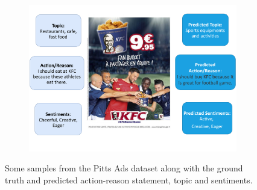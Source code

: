\documentclass[hidelinks,11pt,a4paper]{report}
\begin{document}
\begin{figure}[!h]
\begin{subfigure}[b]{0.49\textwidth}
         \caption{}
         \label{fig:preds-sup-2}
     \end{subfigure}
     \begin{subfigure}[b]{0.49\textwidth}
         \centering
         \includegraphics[width=\textwidth,scale=0.68]{images/preds_sup_8.pdf}
         \caption{}
         \label{fig:preds-sup-8}
     \end{subfigure}
    \caption{Some samples from the Pitts Ads dataset along with the ground truth and predicted action-reason statement, topic and sentiments.}
    \label{fig:preds-sup}
\end{figure}
\end{document}
